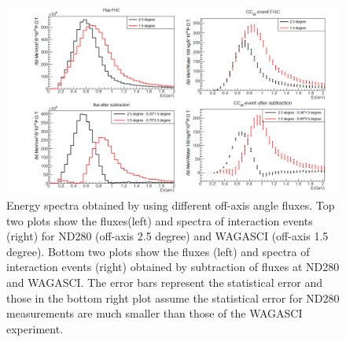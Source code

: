 \begin{figure}[tbhp]
\begin{center}
\includegraphics[width=\textwidth]{fig/fluxsubtractFHC.pdf}
\end{center}
\caption{Energy spectra obtained by using different off-axis angle fluxes.
  Top two plots show the fluxes(left) and spectra of interaction events (right) for ND280 (off-axis 2.5 degree) and WAGASCI (off-axis 1.5 degree). Bottom two plots show the fluxes (left) and spectra of interaction events (right) obtained by
  subtraction of fluxes at ND280 and WAGASCI.
   The error bars represent the statistical error and those in the bottom
right plot assume the statistical error for ND280 measurements are much smaller
than those of the WAGASCI experiment.
}
\label{fig:fluxsubtfhc}
\end{figure}


